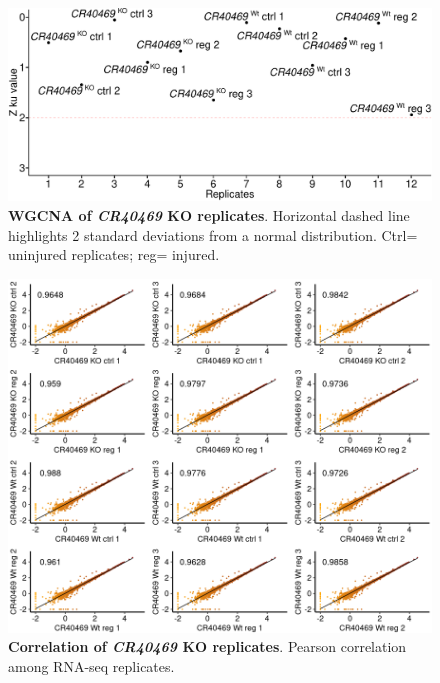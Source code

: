 \begin{figure}[ht!]
  \centering
  \includegraphics[scale=0.6]{plots/appendix/dme/cr40469.ko.wgcna.pdf}
  \caption[WGCNA of \textit{CR40469} KO replicates]{\textbf{WGCNA of \textit{CR40469} KO replicates}. Horizontal dashed line highlights 2 standard deviations from a normal distribution. Ctrl= uninjured replicates; reg= injured.}
  \label{supp-fig:wgcna-cr40469}
\end{figure}

\begin{figure}[ht!]
  \centering
  \includegraphics[scale=0.7]{plots/appendix/dme/qc.cr40469.pdf}
  \caption[Correlation of \textit{CR40469} KO replicates]{\textbf{Correlation of \textit{CR40469} KO replicates}. Pearson correlation among RNA-seq replicates.}
  \label{fig:qc-cr404-rna-seq}
\end{figure}

